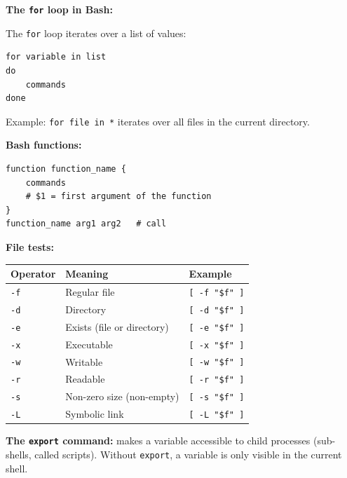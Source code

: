 \documentclass[a4paper,11pt]{article}
\theoremstyle{plain}
\theoremstyle{definition}
\begin{document}
\begin{rappel}
\textbf{The \texttt{for} loop in Bash:}

The \texttt{for} loop iterates over a list of values:
\begin{lstlisting}[numbers=none]
for variable in list
do
    commands
done
\end{lstlisting}
Example: \texttt{for file in *} iterates over all files in the current directory.

\medskip
\textbf{Bash functions:}
\begin{lstlisting}[numbers=none]
function function_name {
    commands
    # $1 = first argument of the function
}
function_name arg1 arg2   # call
\end{lstlisting}

\medskip
\textbf{File tests:}

\begin{center}
\begin{tabular}{lll}
\toprule
\textbf{Operator} & \textbf{Meaning} & \textbf{Example} \\
\midrule
\texttt{-f} & Regular file & \texttt{[ -f "\$f" ]} \\
\texttt{-d} & Directory & \texttt{[ -d "\$f" ]} \\
\texttt{-e} & Exists (file or directory) & \texttt{[ -e "\$f" ]} \\
\texttt{-x} & Executable & \texttt{[ -x "\$f" ]} \\
\texttt{-w} & Writable & \texttt{[ -w "\$f" ]} \\
\texttt{-r} & Readable & \texttt{[ -r "\$f" ]} \\
\texttt{-s} & Non-zero size (non-empty) & \texttt{[ -s "\$f" ]} \\
\texttt{-L} & Symbolic link & \texttt{[ -L "\$f" ]} \\
\bottomrule
\end{tabular}
\end{center}

\medskip
\textbf{The \texttt{export} command:} makes a variable accessible to child processes (sub-shells, called scripts). Without \texttt{export}, a variable is only visible in the current shell.
\end{rappel}
\end{document}

